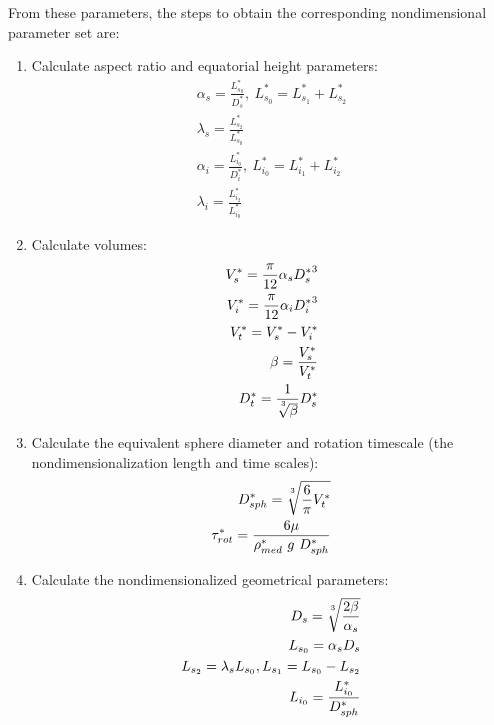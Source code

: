 \documentclass[10pt,a4paper]{article}
\def\non{\nonumber}
\begin{document}
From these parameters, the steps to obtain the corresponding nondimensional parameter set are:
\begin{enumerate}
	\item Calculate aspect ratio and equatorial height parameters:
	\begin{eqnarray}\label{d2ndpars1}
		\alpha_s = \frac{L^*_{s_0}}{D^*_s}, ~ L^*_{s_0} = L^*_{s_1} + L^*_{s_2} \non \\
		\lambda_s = \frac{L^*_{s_2}}{L^*_{s_0}} \non \\
		\alpha_{i} = \frac{L^*_{i_0}}{D^*_i}, ~ L^*_{i_0} = L^*_{i_1} + L^*_{i_2} \non \\
		\lambda_{i} = \frac{L^*_{i_2}}{L^*_{i_0}}
	\end{eqnarray}
	\item Calculate volumes:
	\begin{eqnarray}\label{d2ndpars2}
		V_s^* = \frac{\pi}{12} \alpha_s {D_s^*}^3 \non \\
		V_i^* = \frac{\pi}{12} \alpha_i {D_i^*}^3 \non \\
		V_t^* = V_s^* - V_i^* \non \\
		\beta = \frac{V_s^*}{V_t^*} \non \\
		D_t^* = \frac{1}{\sqrt[\uproot{5}3]{\beta}} D_s^* \non \\
	\end{eqnarray}
	\item Calculate the equivalent sphere diameter and rotation timescale (the nondimensionalization length and time scales):
	\begin{eqnarray}\label{d2ndpars3}
		D_{sph}^* = \sqrt[\uproot{5}3]{\frac{6}{\pi} V_t^*} \non \\
		\tau_{rot}^* = \frac{6 \mu}{\rho^*_{med} ~ g ~ D_{sph}^*}
	\end{eqnarray}
	\item Calculate the nondimensionalized geometrical parameters:
	\begin{eqnarray}\label{d2ndpars4}
		D_s = \sqrt[\uproot{5}3]{\frac{2 \beta}{\alpha_s}} \non \\
		L_{s_0} = \alpha_s D_s \non \\
		L_{s_2} = \lambda_s L_{s_0}, L_{s_1} = L_{s_0} - L_{s_2} \non \\
		L_{i_0} = \frac{L^*_{i_0}}{D_{sph}^*} \non \\

\end{eqnarray}
\end{enumerate}
\end{document}
